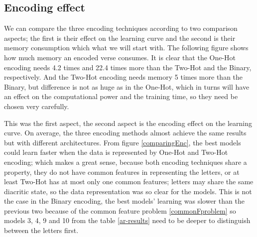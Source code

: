 \subsection*{Encoding effect}
We can compare the three encoding techniques according to two comparison aspects; the
first is their effect on the learning curve and the second is their  memory
consumption  which what we will start with. The following figure shows how much
memory an encoded verse consumes.  It is clear that the One-Hot encoding needs
4.2 times and 22.4 times more than the Two-Hot and the Binary, respectively. And
the Two-Hot encoding needs memory 5 times more than the Binary, but difference is
not as huge as in the One-Hot, which in turns will have an effect on the
computational power and the training time, so they need be chosen very carefully. 
\begin{center}

\end{center}

This was the first aspect, the second aspect is the encoding effect on the
learning curve. On average, the three encoding methods almost achieve the same
results but with different architectures. From figure \ref{comparingEnc}, the
best models could learn faster when the data is represented by One-Hot and
Two-Hot encoding; which makes a great sense, because both encoding techniques
share a property, they do not have common features in representing the letters,
or at least Two-Hot has at most only one common features; letters may share the
same diacritic state, so the data representation was so clear for the models.
This is not the case in the Binary encoding, the
best models' learning was slower than the previous two  because of the common
feature problem \ref{commonFproblem} so models 3, 4, 9 and 10 from the table
\ref{ar-results} need to be deeper to %
distinguish between the letters first. 

 



\begin{center}

\label{comparingEnc}
\end{center}


